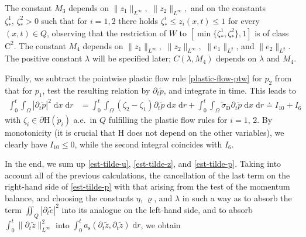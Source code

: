 \documentclass[a4paper,10pt,reqno]{amsart}
\numberwithin{equation}{section}
\numberwithin{equation}{section}
\def\dd{\;\!\mathrm{d}} %
\newcommand{\dev}{\mathrm{D}}
\newcommand{\ass}{a_{\mathrm{s}}}
\newcommand{\EEE}{\color{black}}
\newcommand{\MMM}{\color{black}}%
\begin{document}
 The constant $M_3$ depends on  $\|z_1\|_{L^\infty},$ $  \|z_2\|_{L^\infty}, $
 and on the constants $\zeta_*^1,\, \zeta_*^2 >0$ such that for $i=1,2$ there holds $\zeta_*^i\leq z_i (x,t)  \leq 1$  for every $(x,t)\in Q$, observing that the restriction of $W$ to $[\min\{ \zeta_*^1, \zeta_*^2\}, 1]$ is of class $\mathrm{C}^2$. 
 The constant $M_4$ depends on $\|z_1\|_{L^\infty},$ $  \|z_2\|_{L^\infty}, $
  $\|e_1\|_{L^2}$,  and $\|e_2\|_{L^2}$. The positive constant $\lambda$ will be specified later; $C(\lambda,M_4) $ depends on $\lambda$ and $M_4$. 
 \par
 Finally, we subtract the pointwise plastic flow rule \eqref{plastic-flow-ptw} for $p_2$ from that for $p_1$, test the resulting  relation by 
 $\partial_t\tilde{p}$, and integrate in time. This leads to
  \begin{equation}
\label{est-tilde-p}
 \begin{aligned}
  \int_0^t\int_\Omega |\partial_t \tilde{p}|^2 \dd x \dd r &  = \int_0^t \int_\Omega (\zeta_2{-}\zeta_1) \partial_t\tilde{p} \dd x \dd r + \int_0^t\int_\Omega\tilde{\sigma}_\dev \partial_t \tilde{p} \dd x \dd r \doteq I_{10}+I_6
    \end{aligned}
 \end{equation}
with $\zeta_i  \in \partial \mathrm{H}(\dot{p}_i)$ a.e.\ in $Q$
fulfilling the plastic flow rules for $i=1,\, 2$. 
 By monotonicity  \MMM (it is crucial that $\mathrm{H}$ does not depend on the other variables), \EEE we clearly have $I_{10} \leq 0$, while the second integral coincides with $I_6$. 
 \par
In the end, we sum up \eqref{est-tilde-u}, \eqref{est-tilde-z}, and \eqref{est-tilde-p}. Taking into account all of the previous calculations, the cancellation of the last term on the right-hand side of  \eqref{est-tilde-p} with that arising from the test of the momentum balance, 
and choosing the constants $\eta$, $\varrho$, and $\lambda$ in such a way as to absorb the term 
$ \iint_{Q} |\partial_t \tilde{e}|^2  $ into its analogue on the left-hand side, and to absorb  $ \int_0^t  \|\partial_t \tilde{z}\|_{L^\infty}^2  $ into
$ \int_0^t \ass( \partial_t \tilde{z}, \partial_t \tilde{z}) \dd r$, 
 we obtain
\end{document}
